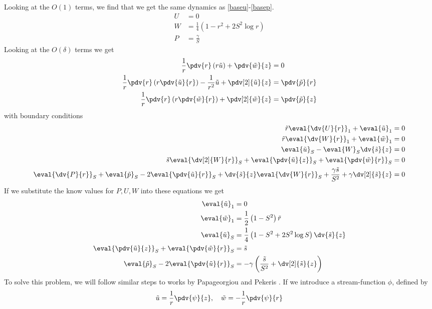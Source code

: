 \documentclass[12pt]{article}
\begin{document}
Looking at the $O(1)$ terms, we find that we get the same dynamics as \eqref{baseu}-\eqref{basep}.
\begin{align}
U&=0\label{baseu1}\\
W&=\frac{1}{4}\left(1-r^2+2S^2\log r\right)\label{basew1}\\
P&=\frac{\gamma}{ S}\label{basep1}
\end{align}
Looking at the $O(\delta)$ terms we get 
\begin{align}
\frac{1}{r}\pdv{r}\left(r\tilde u\right)+\pdv{\tilde w}{z}&=0\label{smallconttop}\\
\frac{1}{r}\pdv{r}\left(r\pdv{\tilde u}{r}\right)-\frac{1}{r^2}\tilde u+\pdv[2]{\tilde u}{z}&=\pdv{\tilde p}{r}\\
\frac{1}{r}\pdv{r}\left(r\pdv{\tilde w}{r}\right)+\pdv[2]{\tilde w}{z}&=\pdv{\tilde p}{z}\label{smallcontbottom}
\end{align}
with boundary conditions
\begin{align}
\tilde r \eval{\dv{U}{r}}_1+\eval{\tilde u}_1&=0\\
\tilde r \eval{\dv{W}{r}}_1+\eval{\tilde w}_1&=0\\
\eval{\tilde u}_{S}-\eval{W}_{S}\dv{\tilde s}{z}&=0\\
\tilde s\eval{\dv[2]{W}{r}}_{S} +\eval{\pdv{\tilde u}{z}}_{S}+\eval{\pdv{\tilde w}{r}}_{S}&=0\\
\eval{\dv{P}{r}}_{S}+\eval{\tilde p}_{S}-2\eval{\pdv{\tilde u}{r}}_{S}+\dv{\tilde s}{z}\eval{\dv{W}{r}}_{S}+\frac{\gamma\tilde s}{ S^2}+\gamma\dv[2]{\tilde s}{z}&=0
\end{align}
If we substitute the know values for $P,U,W$ into these equations we get 
\begin{align}
\eval{\tilde u}_1&=0\label{boundarytop}\\
\eval{\tilde w}_1&= \frac{1}{2}\left(1-S^2\right)\tilde r\\
\eval{\tilde u}_{S}&=\frac{1}{4}\left(1-S^2+2S^2\log S\right)\dv{\tilde s}{z}\\
\eval{\pdv{\tilde u}{z}}_{S}+\eval{\pdv{\tilde w}{r}}_{S}&=\tilde s\\
\eval{\tilde p}_{S}-2\eval{\pdv{\tilde u}{r}}_{S}&=-\gamma\left(\frac{\tilde s}{S^2}+\dv[2]{\tilde s}{z}\right)\label{boundarybottom}
\end{align}
To solve this problem, we will follow similar steps to works by Papageorgiou \cite{doi:10.1063/1.857784} and Pekeris \cite{pekeris48}. If we introduce a stream-function $\phi$, defined by
\begin{align}
\tilde u=\frac{1}{r}\pdv{\psi}{z},\quad \tilde w=-\frac{1}{r}\pdv{\psi}{r}
\end{align}
\end{document}
